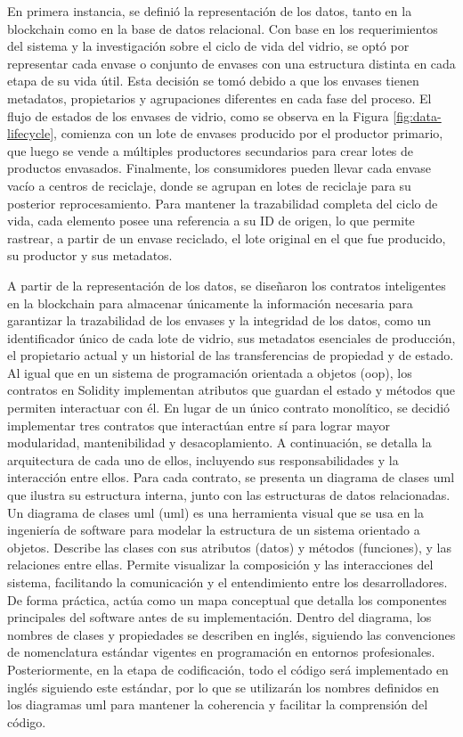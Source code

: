 En primera instancia, se definió la representación de los datos, tanto en la blockchain como en la base de datos relacional. Con base en los requerimientos del sistema y la investigación sobre el ciclo de vida del vidrio, se optó por representar cada envase o conjunto de envases con una estructura distinta en cada etapa de su vida útil. Esta decisión se tomó debido a que los envases tienen metadatos, propietarios y agrupaciones diferentes en cada fase del proceso. El flujo de estados de los envases de vidrio, como se observa en la Figura \ref{fig:data-lifecycle}, comienza con un lote de envases producido por el productor primario, que luego se vende a múltiples productores secundarios para crear lotes de productos envasados. Finalmente, los consumidores pueden llevar cada envase vacío a centros de reciclaje, donde se agrupan en lotes de reciclaje para su posterior reprocesamiento. Para mantener la trazabilidad completa del ciclo de vida, cada elemento posee una referencia a su ID de origen, lo que permite rastrear, a partir de un envase reciclado, el lote original en el que fue producido, su productor y sus metadatos.

A partir de la representación de los datos, se diseñaron los contratos inteligentes en la blockchain para almacenar únicamente la información necesaria para garantizar la trazabilidad de los envases y la integridad de los datos, como un identificador único de cada lote de vidrio, sus metadatos esenciales de producción, el propietario actual y un historial de las transferencias de propiedad y de estado. Al igual que en un sistema de programación orientada a objetos (\acrshort{oop}), los contratos en Solidity implementan atributos que guardan el estado y métodos que permiten interactuar con él. En lugar de un único contrato monolítico, se decidió implementar tres contratos que interactúan entre sí para lograr mayor modularidad, mantenibilidad y desacoplamiento. A continuación, se detalla la arquitectura de cada uno de ellos, incluyendo sus responsabilidades y la interacción entre ellos. Para cada contrato, se presenta un diagrama de clases \acrshort{uml} que ilustra su estructura interna, junto con las estructuras de datos relacionadas. Un diagrama de clases \acrshort{uml} (\acrlong{uml}) es una herramienta visual que se usa en la ingeniería de software para modelar la estructura de un sistema orientado a objetos. Describe las clases con sus atributos (datos) y métodos (funciones), y las relaciones entre ellas. Permite visualizar la composición y las interacciones del sistema, facilitando la comunicación y el entendimiento entre los desarrolladores. De forma práctica, actúa como un mapa conceptual que detalla los componentes principales del software antes de su implementación. Dentro del diagrama, los nombres de clases y propiedades se describen en inglés, siguiendo las convenciones de nomenclatura estándar vigentes en programación en entornos profesionales. Posteriormente, en la etapa de codificación, todo el código será implementado en inglés siguiendo este estándar, por lo que se utilizarán los nombres definidos en los diagramas \acrshort{uml} para mantener la coherencia y facilitar la comprensión del código.

